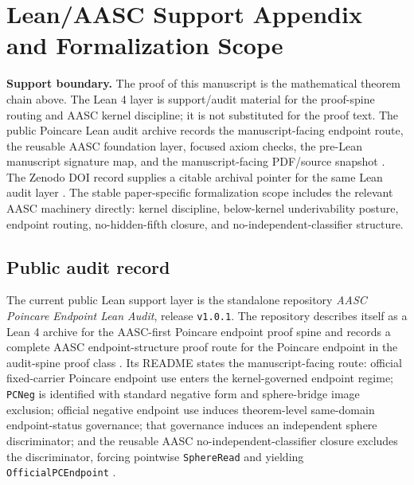\documentclass[11pt]{article}
\begin{document}
\section{Lean/AASC Support Appendix and Formalization Scope}

\begin{mdframed}[backgroundcolor=gray!8,linewidth=0.6pt]
\textbf{Support boundary.} The proof of this manuscript is the mathematical theorem chain above. The Lean 4 layer is support/audit material for the proof-spine routing and AASC kernel discipline; it is not substituted for the proof text. The public Poincare Lean audit archive records the manuscript-facing endpoint route, the reusable AASC foundation layer, focused axiom checks, the pre-Lean manuscript signature map, and the manuscript-facing PDF/source snapshot \cite{PoincareLeanAuditGithub2026}. The Zenodo DOI record supplies a citable archival pointer for the same Lean audit layer \cite{PoincareLeanAuditZenodo2026}. The stable paper-specific formalization scope includes the relevant AASC machinery directly: kernel discipline, below-kernel underivability posture, endpoint routing, no-hidden-fifth closure, and no-independent-classifier structure.
\end{mdframed}

\subsection*{Public audit record}
{}

The current public Lean support layer is the standalone repository \emph{AASC Poincare Endpoint Lean Audit}, release \texttt{v1.0.1}. The repository describes itself as a Lean 4 archive for the AASC-first Poincare endpoint proof spine and records a complete AASC endpoint-structure proof route for the Poincare endpoint in the audit-spine proof class \cite{PoincareLeanAuditGithub2026}. Its README states the manuscript-facing route: official fixed-carrier Poincare endpoint use enters the kernel-governed endpoint regime; \texttt{PCNeg} is identified with standard negative form and sphere-bridge image exclusion; official negative endpoint use induces theorem-level same-domain endpoint-status governance; that governance induces an independent sphere discriminator; and the reusable AASC no-independent-classifier closure excludes the discriminator, forcing pointwise \texttt{SphereRead} and yielding \texttt{OfficialPCEndpoint} \cite{PoincareLeanAuditGithub2026}.
\end{document}
